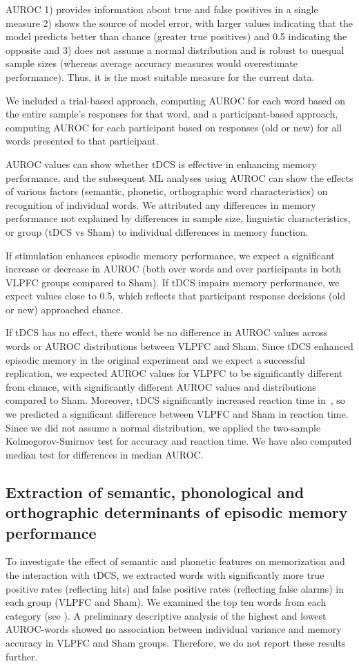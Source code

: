 \documentclass[10pt,letterpaper]{article}
\begin{document}
AUROC 1) provides information about true and false positives in a single measure 2) shows the source of model error, with larger values indicating that the model predicts better than chance (greater true positives) and 0.5 indicating the opposite and 3) does not assume a normal distribution and is robust to unequal sample sizes (whereas average accuracy measures would overestimate performance). Thus, it is the most suitable measure for the current data.

We included a trial-based approach, computing AUROC for each word based on the entire sample’s responses for that word, and a participant-based approach, computing AUROC for each participant based on responses (old or new) for all words presented to that participant.

AUROC values can show whether tDCS is effective in enhancing memory performance, and the subsequent ML analyses using AUROC can show the effects of various factors (semantic, phonetic, orthographic word characteristics) on recognition of individual words. We attributed any differences in memory performance not explained by differences in sample size, linguistic characteristics, or group (tDCS vs Sham) to individual differences in memory function. 

If stimulation enhances episodic memory performance, we expect a significant increase or decrease in AUROC (both over words and over participants in both VLPFC groups compared to Sham). If tDCS impairs memory performance, we expect values close to 0.5, which reflects that participant response decisions (old or new) approached chance.

If tDCS has no effect, there would be no difference in AUROC values across words or AUROC distributions between VLPFC and Sham. Since tDCS enhanced episodic memory in the original experiment and we expect a successful replication, we expected AUROC values for VLPFC to be significantly different from chance, with significantly different AUROC values and distributions compared to Sham. Moreover, tDCS significantly increased reaction time in~\cite{medvedeva2019effects}, so we predicted a significant difference between VLPFC and Sham in reaction time. Since we did not assume a normal distribution, we applied the two-sample Kolmogorov-Smirnov test for accuracy and reaction time. We have also computed median test for differences in median AUROC.

\subsection{Extraction of semantic, phonological and orthographic determinants of episodic memory performance}
To investigate the effect of semantic and phonetic features on memorization and the interaction with tDCS, we extracted words with significantly more true positive rates (reflecting hits) and false positive rates (reflecting false alarms) in each group (VLPFC and Sham). We examined the top ten words from each category (see ). A preliminary descriptive analysis of the highest and lowest AUROC-words showed no association between individual variance and memory accuracy in VLPFC and Sham groups. Therefore, we do not report these results further. 
\end{document}
